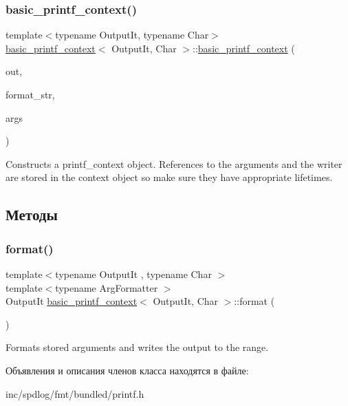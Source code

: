 \subsubsection{\texorpdfstring{basic\+\_\+printf\+\_\+context()}{basic\_printf\_context()}}
{\footnotesize\ttfamily template$<$typename Output\+It, typename Char$>$ \\
\hyperlink{classbasic__printf__context}{basic\+\_\+printf\+\_\+context}$<$ Output\+It, Char $>$\+::\hyperlink{classbasic__printf__context}{basic\+\_\+printf\+\_\+context} (\begin{DoxyParamCaption}\item[{Output\+It}]{out,  }\item[{\hyperlink{classbasic__string__view}{basic\+\_\+string\+\_\+view}$<$ \hyperlink{classbasic__printf__context_a5ceea5767a393451e5a82b2b75a6f63e}{char\+\_\+type} $>$}]{format\+\_\+str,  }\item[{\hyperlink{classbasic__format__args}{basic\+\_\+format\+\_\+args}$<$ \hyperlink{classbasic__printf__context}{basic\+\_\+printf\+\_\+context}$<$ Output\+It, Char $>$ $>$}]{args }\end{DoxyParamCaption})\hspace{0.3cm}{\ttfamily [inline]}}

Constructs a {\ttfamily printf\+\_\+context} object. References to the arguments and the writer are stored in the context object so make sure they have appropriate lifetimes.  

\subsection{Методы}
\mbox{\label{classbasic__printf__context_a931a0b93e495c59094d6d401d40b2921}} 
\subsubsection{\texorpdfstring{format()}{format()}}
{\footnotesize\ttfamily template$<$typename Output\+It , typename Char $>$ \\
template$<$typename Arg\+Formatter $>$ \\
Output\+It \hyperlink{classbasic__printf__context}{basic\+\_\+printf\+\_\+context}$<$ Output\+It, Char $>$\+::format (\begin{DoxyParamCaption}{ }\end{DoxyParamCaption})}

Formats stored arguments and writes the output to the range. 

Объявления и описания членов класса находятся в файле\+:\begin{DoxyCompactItemize}
\item 
inc/spdlog/fmt/bundled/printf.\+h\end{DoxyCompactItemize}
